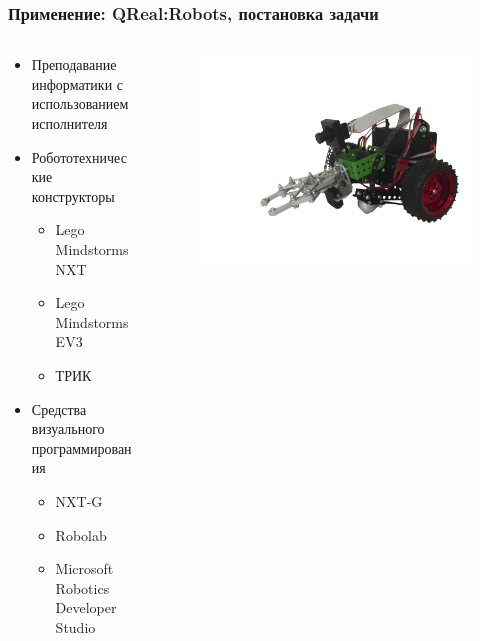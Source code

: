 \documentclass[14pt]{beamer}
\begin{document}
\begin{frame}
    \frametitle{Применение: QReal:Robots, постановка задачи}
    \begin{columns}[onlytextwidth]
       \begin{column}{0.7\textwidth}
            \begin{itemize}
                \item Преподавание информатики с использованием исполнителя
                \item Робототехнические конструкторы
                \begin{itemize}
                    \item Lego Mindstorms NXT
                    \item Lego Mindstorms EV3
                    \item ТРИК
                \end{itemize}
                \item Средства визуального программирования
                \begin{itemize}
                    \item NXT-G
                    \item Robolab
                    \item Microsoft Robotics Developer Studio
                \end{itemize}
            \end{itemize}
        \end{column}
        \begin{column}{0.3\textwidth}
            \begin{figure}
            	\begin{center}
             		\includegraphics[width=\textwidth]{images/presentation/trik.png}\\

\end{center}
\end{figure}
\end{column}
\end{columns}
\end{frame}
\end{document}
